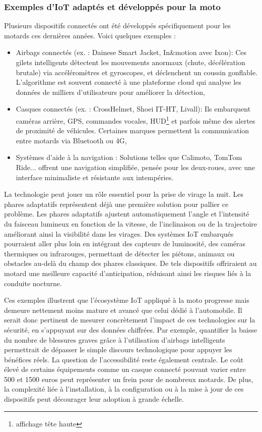 \subsubsection{Exemples d’IoT adaptés et développés pour la moto}
Plusieurs dispositifs connectés ont été développés spécifiquement pour les motards ces dernières années. Voici quelques exemples :
\begin{itemize}
  \item Airbags connectés (ex. : Dainese Smart Jacket, In\&motion avec Ixon): Ces gilets intelligents détectent les mouvements anormaux (chute, décélération brutale) via accéléromètres et gyroscopes, et déclenchent un coussin gonflable. L’algorithme est souvent connecté à une plateforme cloud qui analyse les données de milliers d’utilisateurs pour améliorer la détection,
  \item Casques connectés (ex. : CrossHelmet, Shoei IT-HT, Livall): Ils embarquent caméras arrière, GPS, commandes vocales, HUD\footnote{affichage tête haute} et parfois même des alertes de proximité de véhicules. Certaines marques permettent la communication entre motards via Bluetooth ou 4G,
  \item Systèmes d’aide à la navigation : Solutions telles que Calimoto, TomTom Ride... offrent une navigation simplifiée, pensée pour les deux-roues, avec une interface minimaliste et résistante aux intempéries.
\end{itemize}
\vspace{0.5cm}
La technologie peut jouer un rôle essentiel pour la prise de virage la nuit. Les phares adaptatifs représentent déjà une première solution pour pallier ce problème. Les phares adaptatifs ajustent automatiquement l’angle et l’intensité du faisceau lumineux en fonction de la vitesse, de l’inclinaison ou de la trajectoire améliorant ainsi la visibilité dans les virages. Des systèmes IoT embarqués pourraient aller plus loin en intégrant des capteurs de luminosité, des caméras thermiques ou infrarouges, permettant de détecter les piétons, animaux ou obstacles au-delà du champ des phares classiques. De tels dispositifs offriraient au motard une meilleure capacité d’anticipation, réduisant ainsi les risques liés à la conduite nocturne.
\vspace{0.5cm}

Ces exemples illustrent que l’écosystème IoT appliqué à la moto progresse mais demeure nettement moins mature et avancé que celui dédié à l’automobile. Il serait donc pertinent de mesurer concrètement l’impact de ces technologies sur la sécurité, en s’appuyant sur des données chiffrées. Par exemple, quantifier la baisse du nombre de blessures graves grâce à l’utilisation d’airbags intelligents permettrait de dépasser le simple discours technologique pour appuyer les bénéfices réels.
La question de l’accessibilité reste également centrale. Le coût élevé de certains équipements comme un casque connecté pouvant varier entre 500 et 1500 euros peut représenter un frein pour de nombreux motards. De plus, la complexité liée à l’installation, à la configuration ou à la mise à jour de ces dispositifs peut décourager leur adoption à grande échelle.

